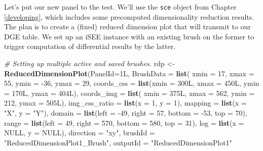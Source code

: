 \documentclass[
]{book}
\newenvironment{Shaded}{\begin{snugshade}}{\end{snugshade}}
\newcommand{\CommentTok}[1]{\textcolor[rgb]{0.56,0.35,0.01}{\textit{#1}}}
\newcommand{\DataTypeTok}[1]{\textcolor[rgb]{0.13,0.29,0.53}{#1}}
\newcommand{\DecValTok}[1]{\textcolor[rgb]{0.00,0.00,0.81}{#1}}
\newcommand{\KeywordTok}[1]{\textcolor[rgb]{0.13,0.29,0.53}{\textbf{#1}}}
\newcommand{\NormalTok}[1]{#1}
\newcommand{\OtherTok}[1]{\textcolor[rgb]{0.56,0.35,0.01}{#1}}
\newcommand{\StringTok}[1]{\textcolor[rgb]{0.31,0.60,0.02}{#1}}
\begin{document}
Let's put our new panel to the test.
We'll use the \texttt{sce} object from Chapter \ref{developing}, which includes some precomputed dimensionality reduction results.
The plan is to create a (fixed) reduced dimension plot that will transmit to our DGE table.
We set up an iSEE instance with an existing brush on the former to trigger computation of differential results by the latter.

\begin{Shaded}
\begin{Highlighting}[]
\CommentTok{# Setting up multiple active and saved brushes.}
\NormalTok{rdp <-}\StringTok{ }\KeywordTok{ReducedDimensionPlot}\NormalTok{(}\DataTypeTok{PanelId=}\NormalTok{1L,}
    \DataTypeTok{BrushData =} \KeywordTok{list}\NormalTok{(}
        \DataTypeTok{xmin =} \DecValTok{17}\NormalTok{, }\DataTypeTok{xmax =} \DecValTok{55}\NormalTok{, }\DataTypeTok{ymin =} \DecValTok{-36}\NormalTok{, }\DataTypeTok{ymax =} \DecValTok{29}\NormalTok{, }
        \DataTypeTok{coords_css =} \KeywordTok{list}\NormalTok{(}\DataTypeTok{xmin =}\NormalTok{ 300L, }\DataTypeTok{xmax =}\NormalTok{ 450L, }\DataTypeTok{ymin =}\NormalTok{ 170L, }\DataTypeTok{ymax =}\NormalTok{ 404L), }
        \DataTypeTok{coords_img =} \KeywordTok{list}\NormalTok{( }\DataTypeTok{xmin =}\NormalTok{ 375L, }\DataTypeTok{xmax =} \DecValTok{562}\NormalTok{, }\DataTypeTok{ymin =} \DecValTok{212}\NormalTok{, }\DataTypeTok{ymax =}\NormalTok{ 505L), }
        \DataTypeTok{img_css_ratio =} \KeywordTok{list}\NormalTok{(}\DataTypeTok{x =} \DecValTok{1}\NormalTok{, }\DataTypeTok{y =} \DecValTok{1}\NormalTok{), }
        \DataTypeTok{mapping =} \KeywordTok{list}\NormalTok{(}\DataTypeTok{x =} \StringTok{"X"}\NormalTok{, }\DataTypeTok{y =} \StringTok{"Y"}\NormalTok{), }
        \DataTypeTok{domain =} \KeywordTok{list}\NormalTok{(}\DataTypeTok{left =} \DecValTok{-49}\NormalTok{, }\DataTypeTok{right =} \DecValTok{57}\NormalTok{, }\DataTypeTok{bottom =} \DecValTok{-53}\NormalTok{, }\DataTypeTok{top =} \DecValTok{70}\NormalTok{), }
        \DataTypeTok{range =} \KeywordTok{list}\NormalTok{(}\DataTypeTok{left =} \DecValTok{49}\NormalTok{, }\DataTypeTok{right =} \DecValTok{570}\NormalTok{, }\DataTypeTok{bottom =} \DecValTok{580}\NormalTok{, }\DataTypeTok{top =} \DecValTok{31}\NormalTok{), }
        \DataTypeTok{log =} \KeywordTok{list}\NormalTok{(}\DataTypeTok{x =} \OtherTok{NULL}\NormalTok{, }\DataTypeTok{y =} \OtherTok{NULL}\NormalTok{), }
        \DataTypeTok{direction =} \StringTok{"xy"}\NormalTok{, }\DataTypeTok{brushId =} \StringTok{"ReducedDimensionPlot1_Brush"}\NormalTok{, }
        \DataTypeTok{outputId =} \StringTok{"ReducedDimensionPlot1"}

\end{Highlighting}
\end{Shaded}
\end{document}
